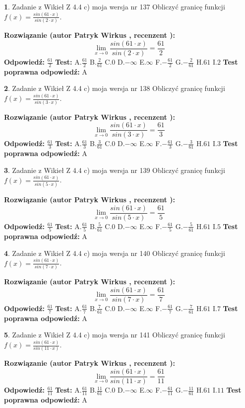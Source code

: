 \documentclass[12pt, a4paper]{article}
\theoremstyle{definition} %
\newtheorem{zad}{}
\newcommand{\zadStart}[1]{\begin{zad}#1\newline}
\newcommand{\zadStop}{\end{zad}}
\newcommand{\rozwStart}[2]{\noindent \textbf{Rozwiązanie (autor #1 , recenzent #2): }\newline}
\newcommand{\rozwStop}{\newline}
\newcommand{\odpStart}{\noindent \textbf{Odpowiedź:}\newline}
\newcommand{\odpStop}{\newline}
\newcommand{\testStart}{\noindent \textbf{Test:}\newline}
\newcommand{\testStop}{\newline}
\newcommand{\kluczStart}{\noindent \textbf{Test poprawna odpowiedź:}\newline}
\newcommand{\kluczStop}{\newline}
\begin{document}
\zadStart{Zadanie z Wikieł Z 4.4 c) moja wersja nr 137}
Obliczyć granicę funkcji $f(x)=\frac{sin(61\cdot x)}{sin(2\cdot x)}$.
\zadStop
\rozwStart{Patryk Wirkus}{}
$$\lim\limits_{x\to 0}\frac{sin(61\cdot x)}{sin(2\cdot x)}=
\frac{61}{2}$$
\rozwStop
\odpStart
$\frac{61}{2}$
\odpStop
\testStart
A.$\frac{61}{2}$
B.$\frac{2}{61}$
C.$0$
D.$-\infty$
E.$\infty$
F.$-\frac{61}{2}$
G.$-\frac{2}{61}$
H.$61$
I.$2$
\testStop
\kluczStart
A
\kluczStop



\zadStart{Zadanie z Wikieł Z 4.4 c) moja wersja nr 138}
Obliczyć granicę funkcji $f(x)=\frac{sin(61\cdot x)}{sin(3\cdot x)}$.
\zadStop
\rozwStart{Patryk Wirkus}{}
$$\lim\limits_{x\to 0}\frac{sin(61\cdot x)}{sin(3\cdot x)}=
\frac{61}{3}$$
\rozwStop
\odpStart
$\frac{61}{3}$
\odpStop
\testStart
A.$\frac{61}{3}$
B.$\frac{3}{61}$
C.$0$
D.$-\infty$
E.$\infty$
F.$-\frac{61}{3}$
G.$-\frac{3}{61}$
H.$61$
I.$3$
\testStop
\kluczStart
A
\kluczStop



\zadStart{Zadanie z Wikieł Z 4.4 c) moja wersja nr 139}
Obliczyć granicę funkcji $f(x)=\frac{sin(61\cdot x)}{sin(5\cdot x)}$.
\zadStop
\rozwStart{Patryk Wirkus}{}
$$\lim\limits_{x\to 0}\frac{sin(61\cdot x)}{sin(5\cdot x)}=
\frac{61}{5}$$
\rozwStop
\odpStart
$\frac{61}{5}$
\odpStop
\testStart
A.$\frac{61}{5}$
B.$\frac{5}{61}$
C.$0$
D.$-\infty$
E.$\infty$
F.$-\frac{61}{5}$
G.$-\frac{5}{61}$
H.$61$
I.$5$
\testStop
\kluczStart
A
\kluczStop



\zadStart{Zadanie z Wikieł Z 4.4 c) moja wersja nr 140}
Obliczyć granicę funkcji $f(x)=\frac{sin(61\cdot x)}{sin(7\cdot x)}$.
\zadStop
\rozwStart{Patryk Wirkus}{}
$$\lim\limits_{x\to 0}\frac{sin(61\cdot x)}{sin(7\cdot x)}=
\frac{61}{7}$$
\rozwStop
\odpStart
$\frac{61}{7}$
\odpStop
\testStart
A.$\frac{61}{7}$
B.$\frac{7}{61}$
C.$0$
D.$-\infty$
E.$\infty$
F.$-\frac{61}{7}$
G.$-\frac{7}{61}$
H.$61$
I.$7$
\testStop
\kluczStart
A
\kluczStop



\zadStart{Zadanie z Wikieł Z 4.4 c) moja wersja nr 141}
Obliczyć granicę funkcji $f(x)=\frac{sin(61\cdot x)}{sin(11\cdot x)}$.
\zadStop
\rozwStart{Patryk Wirkus}{}
$$\lim\limits_{x\to 0}\frac{sin(61\cdot x)}{sin(11\cdot x)}=
\frac{61}{11}$$
\rozwStop
\odpStart
$\frac{61}{11}$
\odpStop
\testStart
A.$\frac{61}{11}$
B.$\frac{11}{61}$
C.$0$
D.$-\infty$
E.$\infty$
F.$-\frac{61}{11}$
G.$-\frac{11}{61}$
H.$61$
I.$11$
\testStop
\kluczStart
A
\kluczStop
\end{document}
